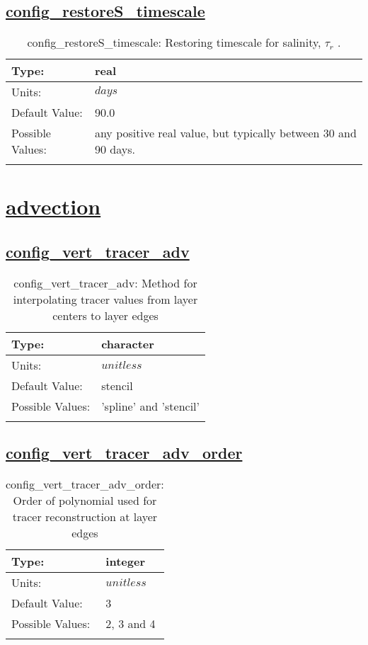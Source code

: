 \subsection[config\_restoreS\_timescale]{\hyperref[sec:nm_tab_forcing]{config\_restoreS\_timescale}}
\label{subsec:nm_sec_config_restoreS_timescale}
\begin{center}
\begin{longtable}{| p{2.0in} | p{4.0in} |}
    \hline
    Type: & real \\
    \hline
    Units: & $days$ \\
    \hline
    Default Value: & 90.0 \\
    \hline
    Possible Values: & any positive real value, but typically between 30 and 90 days. \\
    \hline
    \caption{config\_restoreS\_timescale:  Restoring timescale for salinity,  $\tau_r$ .}
\end{longtable}
\end{center}
\section[advection]{\hyperref[sec:nm_tab_advection]{advection}}
\label{sec:nm_sec_advection}
\subsection[config\_vert\_tracer\_adv]{\hyperref[sec:nm_tab_advection]{config\_vert\_tracer\_adv}}
\label{subsec:nm_sec_config_vert_tracer_adv}
\begin{center}
\begin{longtable}{| p{2.0in} | p{4.0in} |}
    \hline
    Type: & character \\
    \hline
    Units: & $unitless$ \\
    \hline
    Default Value: & stencil \\
    \hline
    Possible Values: & 'spline' and 'stencil' \\
    \hline
    \caption{config\_vert\_tracer\_adv: Method for interpolating tracer values from layer centers to layer edges}
\end{longtable}
\end{center}
\subsection[config\_vert\_tracer\_adv\_order]{\hyperref[sec:nm_tab_advection]{config\_vert\_tracer\_adv\_order}}
\label{subsec:nm_sec_config_vert_tracer_adv_order}
\begin{center}
\begin{longtable}{| p{2.0in} | p{4.0in} |}
    \hline
    Type: & integer \\
    \hline
    Units: & $unitless$ \\
    \hline
    Default Value: & 3 \\
    \hline
    Possible Values: & 2, 3 and 4 \\
    \hline
    \caption{config\_vert\_tracer\_adv\_order: Order of polynomial used for tracer reconstruction at layer edges}
\end{longtable}
\end{center}
